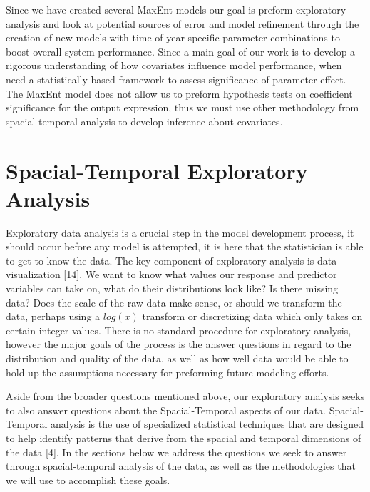 \noindent Since we have created several MaxEnt models our goal is preform exploratory analysis and look at potential sources of error and model refinement through the creation of new models with time-of-year specific parameter combinations to boost overall system performance. Since a main goal of our work is to develop a rigorous understanding of how covariates influence model performance, when need a statistically based framework to assess significance of parameter effect. The MaxEnt model does not allow us to preform hypothesis tests on coefficient significance for the output expression, thus we must use other methodology from spacial-temporal analysis to develop inference about covariates. 


\section{Spacial-Temporal Exploratory Analysis} 

Exploratory data analysis is a crucial step in the model development process, it should occur before any model is attempted, it is here that the statistician is able to get to know the data. The key component of exploratory analysis is data visualization [14]. We want to know what values our response and predictor variables can take on, what do their distributions look like? Is there missing data? Does the scale of the raw data make sense, or should we transform the data, perhaps using a $log(x)$ transform or discretizing data which only takes on certain integer values. There is no standard procedure for exploratory analysis, however the major goals of the process is the answer questions in regard to the distribution and quality of the data, as well as how well data would be able to hold up the assumptions necessary for preforming future modeling efforts.\newline

\noindent Aside from the broader questions mentioned above, our exploratory analysis seeks to also answer questions about the Spacial-Temporal aspects of our data. Spacial-Temporal analysis is the use of specialized statistical techniques that are designed to help identify patterns that derive from the spacial and temporal dimensions of the data [4].  In the sections below we address the questions we seek to answer through spacial-temporal analysis of the data, as well as the methodologies that we will use to accomplish these goals. \newline

